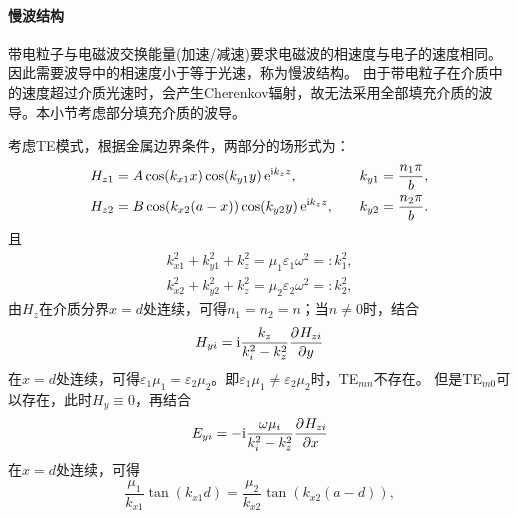 \paragraph{慢波结构}
带电粒子与电磁波交换能量(加速/减速)要求电磁波的相速度与电子的速度相同。
因此需要波导中的相速度小于等于光速，称为慢波结构。
由于带电粒子在介质中的速度超过介质光速时，会产生Cherenkov辐射，故无法采用全部填充介质的波导。本小节考虑部分填充介质的波导。
\begin{center}
    \label{fig:rectangle waveguide part-filled}
\end{center}
考虑TE模式，根据金属边界条件，两部分的场形式为：
\begin{alignat*}{2}
    H_{z1}&=A\cos(k_{x1}x)\cos(k_{y1}y)\mathop{}\!\mathrm{e}^{\mathrm{i} k_zz},&k_{y1}&=\frac{n_1\pi}b,\\
    H_{z2}&=B\cos(k_{x2}(a-x))\cos(k_{y2}y)\mathop{}\!\mathrm{e}^{\mathrm{i} k_zz},&\quad k_{y2}&=\frac{n_2\pi}b.
\end{alignat*}
且
\begin{subequations}
    \begin{align}
        k_{x1}^2+k_{y1}^2+k_z^2=\mu_1\varepsilon_1\omega^2=:k_1^2,\\
        k_{x2}^2+k_{y2}^2+k_z^2=\mu_2\varepsilon_2\omega^2=:k_2^2,
    \end{align}
\end{subequations}
由$H_z$在介质分界$x=d$处连续，可得$n_1=n_2=n$；当$n\neq 0$时，结合
\[
    H_{yi}=\mathrm{i}\frac{k_z}{k_i^2-k_z^2}\frac{\partial^{{}}H_{zi}}{\partial{y}^{{}}}
\]
在$x=d$处连续，可得$\varepsilon_1\mu_1=\varepsilon_2\mu_2$。即$\varepsilon_1\mu_1\neq\varepsilon_2\mu_2$时，TE$_{mn}$不存在。
但是TE$_{m0}$可以存在，此时$H_y\equiv 0$，再结合
\[
    E_{yi}=-\mathrm{i}\frac{\omega\mu_i}{k_i^2-k_z^2}\frac{\partial^{{}}H_{zi}}{\partial{x}^{{}}}
\]
在$x=d$处连续，可得
\begin{equation}
    \frac{\mu_1}{k_{x1}}\tan(k_{x1}d)=\frac{\mu_2}{k_{x2}}\tan(k_{x2}(a-d)),
\end{equation}
